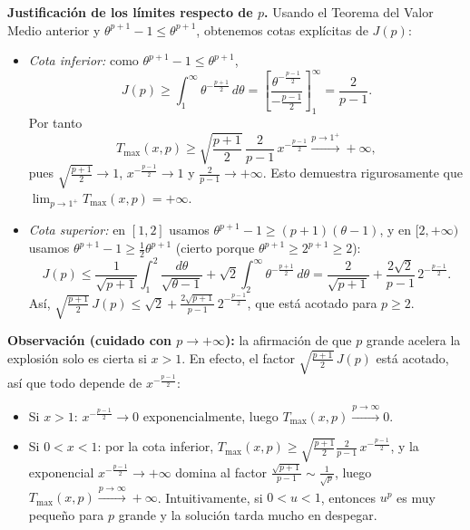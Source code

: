 {    \textbf{Justificación de los límites respecto de $p$.} Usando el Teorema del Valor Medio anterior y $\theta^{p+1} - 1 \le \theta^{p+1}$, obtenemos cotas explícitas de $J(p)$:
    \begin{itemize}
        \item \textit{Cota inferior:} como $\theta^{p+1} - 1 \le \theta^{p+1}$,
        \[
            J(p) \ge \int_1^\infty \theta^{-\frac{p+1}{2}} \, d\theta = \left[ \frac{\theta^{-\frac{p-1}{2}}}{-\frac{p-1}{2}} \right]_1^\infty = \frac{2}{p-1}.
        \]
        Por tanto
        \[
            T_{\max}(x, p) \ge \sqrt{\frac{p+1}{2}} \, \frac{2}{p-1} \, x^{-\frac{p-1}{2}} \xrightarrow{p \to 1^+} +\infty,
        \]
        pues $\sqrt{\frac{p+1}{2}} \to 1$, $x^{-\frac{p-1}{2}} \to 1$ y $\frac{2}{p-1} \to +\infty$. Esto demuestra rigurosamente que $\lim_{p \to 1^+} T_{\max}(x, p) = +\infty$.
        \item \textit{Cota superior:} en $[1, 2]$ usamos $\theta^{p+1} - 1 \ge (p+1)(\theta - 1)$, y en $[2, +\infty)$ usamos $\theta^{p+1} - 1 \ge \frac{1}{2} \theta^{p+1}$ (cierto porque $\theta^{p+1} \ge 2^{p+1} \ge 2$):
        \[
            J(p) \le \frac{1}{\sqrt{p+1}} \int_1^2 \frac{d\theta}{\sqrt{\theta - 1}} + \sqrt{2} \int_2^\infty \theta^{-\frac{p+1}{2}} \, d\theta = \frac{2}{\sqrt{p+1}} + \frac{2\sqrt{2}}{p-1} \, 2^{-\frac{p-1}{2}}.
        \]
        Así, $\sqrt{\frac{p+1}{2}} \, J(p) \le \sqrt{2} + \frac{2\sqrt{p+1}}{p-1} \, 2^{-\frac{p-1}{2}}$, que está acotado para $p \ge 2$.
    \end{itemize}
    \textbf{Observación (cuidado con $p \to +\infty$):} la afirmación de que $p$ grande acelera la explosión solo es cierta si $x > 1$. En efecto, el factor $\sqrt{\frac{p+1}{2}} \, J(p)$ está acotado, así que todo depende de $x^{-\frac{p-1}{2}}$:
    \begin{itemize}
        \item Si $x > 1$: $x^{-\frac{p-1}{2}} \to 0$ exponencialmente, luego $T_{\max}(x, p) \xrightarrow{p \to \infty} 0$.
        \item Si $0 < x < 1$: por la cota inferior, $T_{\max}(x, p) \ge \sqrt{\frac{p+1}{2}} \frac{2}{p-1} \, x^{-\frac{p-1}{2}}$, y la exponencial $x^{-\frac{p-1}{2}} \to +\infty$ domina al factor $\frac{\sqrt{p+1}}{p-1} \sim \frac{1}{\sqrt{p}}$, luego $T_{\max}(x, p) \xrightarrow{p \to \infty} +\infty$. Intuitivamente, si $0 < u < 1$, entonces $u^p$ es muy pequeño para $p$ grande y la solución tarda mucho en despegar.
    \end{itemize}
}


